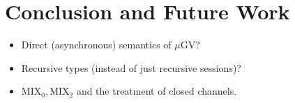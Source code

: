 \documentclass[orivec,envcountsame]{llncs}
\newcommand{\mugv}{$\mu\mathrm{GV}$\xspace}
\begin{document}
\section{Conclusion and Future Work}\label{sec:future}

\begin{itemize}
\item Direct (asynchronous) semantics of \mugv{}?
\item Recursive types (instead of just recursive sessions)?
\item $\mathrm{MIX}_0,\mathrm{MIX}_2$ and the treatment of closed channels.
\end{itemize}

\label{sect:bib}


\end{document}
